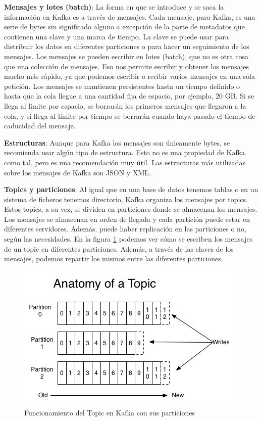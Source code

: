 \textbf{Mensajes y lotes (batch)}: La forma en que se introduce y se saca la información en Kafka es a través de mensajes. Cada mensaje, para Kafka, es una serie de bytes sin significado alguno a excepción de la parte de metadatos que contienen una clave y una marca de tiempo. La clave se puede usar para distribuir los datos en diferentes particiones o para hacer un seguimiento de los mensajes. Los mensajes se pueden escribir en lotes (batch), que no es otra cosa que una colección de mensajes. Eso nos permite escribir y obtener los mensajes mucho más rápido, ya que podemos escribir o recibir varios mensajes en una sola petición. Los mensajes se mantienen persistentes hasta un tiempo definido o hasta que la cola llegue a una cantidad fija de espacio, por ejemplo, 20 GB. Si se llega al límite por espacio, se borrarán los primeros mensajes que llegaron a la cola, y si llega al límite por tiempo se borrarán cuando haya pasado el tiempo de caducidad del mensaje.\par

\textbf{Estructuras}: Aunque para Kafka los mensajes son únicamente bytes, se recomienda usar algún tipo de estructura. Esto no es una propiedad de Kafka como tal, pero es una recomendación muy útil. Las estructuras más utilizadas sobre los mensajes de Kafka son JSON y XML.\par

\textbf{Topics y particiones}: Al igual que en una base de datos tenemos tablas o en un sistema de ficheros tenemos directorio, Kafka organiza los mensajes por topics. Estos topics, a su vez, se dividen en particiones donde se almacenan los mensajes. Los mensajes se almacenan en orden de llegada y cada partición puede estar en diferentes servidores. Además. puede haber replicación en las particiones o no, según las necesidades. En la figura \ref{Kfk-img-1} \cite{Kfk-2} podemos ver cómo se escriben los mensajes de un topic en diferentes particiones. Además, a través de las claves de los mensajes, podemos repartir los mismos entre las diferentes particiones.\par


\begin{figure}[htp]
\centering
\includegraphics[scale=0.75]{Imagenes/kafka1.png}
\caption{Funcionamiento del Topic en Kafka con sus particiones}
\label{Kfk-img-1}
\end{figure}


